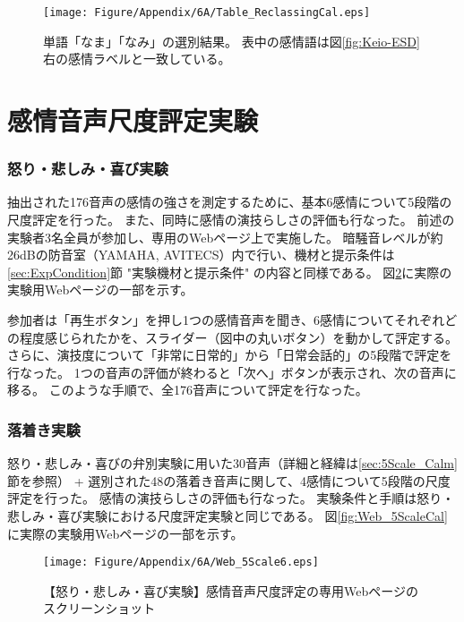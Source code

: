 \begin{figure}[h]
  \vspace{10pt}
  \centering
  \texttt{[image: Figure/Appendix/6A/Table\_ReclassingCal.eps]}
  \caption{
    単語「なま」「なみ」の選別結果。
    表中の感情語は図\ref{fig:Keio-ESD}右の感情ラベルと一致している。
    }
  \label{fig:ReclassingCal}
\end{figure}


\section{感情音声尺度評定実験}
\label{sec:5Scaling}
\subsubsection{怒り・悲しみ・喜び実験}
抽出された176音声の感情の強さを測定するために、基本6感情について5段階の尺度評定を行った。
また、同時に感情の演技らしさの評価も行なった。
前述の実験者3名全員が参加し、専用のWebページ上で実施した。
暗騒音レベルが約26dBの防音室（YAMAHA, AVITECS）内で行い、機材と提示条件は\ref{sec:ExpCondition}節 "実験機材と提示条件" の内容と同様である。
図\ref{fig:Web_5Scale6}に実際の実験用Webページの一部を示す。

参加者は「再生ボタン」を押し1つの感情音声を聞き、6感情についてそれぞれどの程度感じられたかを、スライダー（図中の丸いボタン）を動かして評定する。
さらに、演技度について「非常に日常的」から「日常会話的」の5段階で評定を行なった。
1つの音声の評価が終わると「次へ」ボタンが表示され、次の音声に移る。
このような手順で、全176音声について評定を行なった。

\subsubsection{落着き実験}
怒り・悲しみ・喜びの弁別実験に用いた30音声（詳細と経緯は\ref{sec:5Scale_Calm}節を参照） + 選別された48の落着き音声に関して、4感情について5段階の尺度評定を行った。
感情の演技らしさの評価も行なった。
実験条件と手順は怒り・悲しみ・喜び実験における尺度評定実験と同じである。
図\ref{fig:Web_5ScaleCal}に実際の実験用Webページの一部を示す。


\begin{figure}[h]
  \vspace{10pt}
  \centering
  \texttt{[image: Figure/Appendix/6A/Web\_5Scale6.eps]}
  \caption{
    【怒り・悲しみ・喜び実験】感情音声尺度評定の専用Webページのスクリーンショット
    }
  \label{fig:Web_5Scale6}
\end{figure}

